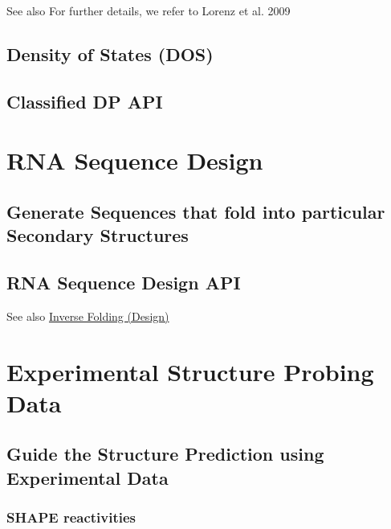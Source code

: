 \begin{DoxySeeAlso}{See also}
For further details, we refer to Lorenz et al. 2009 \cite{lorenz:2009}
\end{DoxySeeAlso}
\hypertarget{classified_dp_density_of_states}{}\subsection{Density of States (\+D\+O\+S)}\label{classified_dp_density_of_states}
\hypertarget{classified_dp_classified_dp_api}{}\subsection{Classified D\+P A\+PI}\label{classified_dp_classified_dp_api}
 \hypertarget{design}{}\section{R\+NA Sequence Design}\label{design}
\hypertarget{design_design_intro}{}\subsection{Generate Sequences that fold into particular Secondary Structures}\label{design_design_intro}
\hypertarget{design_design_api}{}\subsection{R\+N\+A Sequence Design A\+PI}\label{design_design_api}
\begin{DoxySeeAlso}{See also}
\hyperlink{group__inverse__fold}{Inverse Folding (Design)}
\end{DoxySeeAlso}
 \hypertarget{structure_probing_data}{}\section{Experimental Structure Probing Data}\label{structure_probing_data}
\hypertarget{structure_probing_data_structure_probing_intro}{}\subsection{Guide the Structure Prediction using Experimental Data}\label{structure_probing_data_structure_probing_intro}
\hypertarget{structure_probing_data_structure_probing_SHAPE}{}\subsubsection{S\+H\+A\+P\+E reactivities}\label{structure_probing_data_structure_probing_SHAPE}
